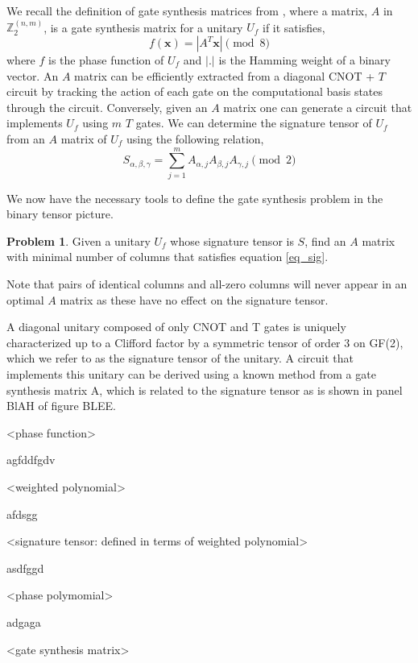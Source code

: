 \documentclass[titlepage]{article}
\theoremstyle{definition}
\theoremstyle{problem}
\newtheorem{problem}{Problem}[section]
\theoremstyle{lemma}
\begin{document}
We recall the definition of gate synthesis matrices from \cite{4_Campbell_2017}, where a matrix, $A$ in $\mathbb{Z}_2^{(n,m)}$, is a gate synthesis matrix for a unitary $U_f$ if it satisfies,
\begin{equation}
\label{eq_gsm}
f(\mathbf{x}) = |A^T\mathbf{x}| \pmod{8}
\end{equation}
where $f$ is the phase function of $U_f$ and $|.|$ is the Hamming weight of a binary vector. An $A$ matrix can be efficiently extracted from a diagonal CNOT + $T$ circuit by tracking the action of each gate on the computational basis states through the circuit. Conversely, given an $A$ matrix one can generate a circuit that implements $U_f$ using $m$ $T$ gates. We can determine the signature tensor of $U_f$ from an $A$ matrix of $U_f$ using the following relation,
\begin{equation}
\label{eq_sig}
S_{\alpha,\beta,\gamma} = \sum_{j=1}^m A_{\alpha,j}A_{\beta,j}A_{\gamma,j} \pmod{2}
\end{equation}

We now have the necessary tools to define the gate synthesis problem in the binary tensor picture.
\theoremstyle{problem}
\begin{problem}{}
	Given a unitary $U_f$ whose signature tensor is $S$, find an $A$ matrix with minimal number of columns that satisfies equation \ref{eq_sig}.
	\label{pr_1}
\end{problem}
Note that pairs of identical columns and all-zero columns will never appear in an optimal $A$ matrix as these have no effect on the signature tensor.

\iffalse A diagonal unitary composed of only CNOT and T gates is uniquely characterized up to a Clifford factor by a symmetric tensor of order 3 on GF(2), which we refer to as the signature tensor of the unitary. A circuit that implements this unitary can be derived using a known method from a gate synthesis matrix A, which is related to the signature tensor as is shown in panel BlAH of figure BLEE.

<phase function>

agfddfgdv

<weighted polynomial>

afdsgg

<signature tensor: defined in terms of weighted polynomial>

asdfggd

<phase polymomial>

adgaga

<gate synthesis matrix>
\end{document}
